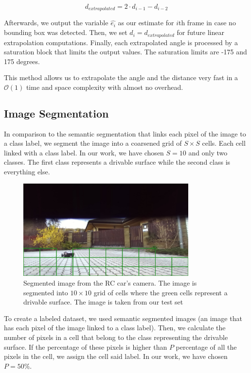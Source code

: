 \begin{equation}
d_{extrapolated} = 2\cdot d_{i-1} - d_{i-2}
\end{equation}

Afterwards, we output the variable $\hat{e_{i}}$ as our estimate for $i$th frame in case no bounding box was detected. Then, we set $d_i = d_{extrapolated}$ for future linear extrapolation computations. Finally, each extrapolated angle is processed by a saturation block that limits the output values. The saturation limits are -175 and 175 degrees. \par


This method allows us to extrapolate the angle and the distance very fast in a $\mathcal{O}(1)$ time and space complexity with almost no overhead.




\subsection{Image Segmentation}
In comparison to the semantic segmentation that links each pixel of the image to a class label, we segment the image into a coarsened grid of $S\times S$ cells. Each cell linked with a class label. In our work, we have chosen $S=10$ and only two classes. The first class represents a drivable surface while the second class is everything else. \par


\begin{figure}[h!]
    \centering
    \includegraphics[width=0.8\textwidth]{images/segmented_image.png}
    
    \caption{Segmented image from the RC car's camera. The image is segmented into $10\times 10$ grid of cells where the green cells represent a drivable surface. The image is taken from our test set}\label{f:segmented_image}
\end{figure}

To create a labeled dataset, we used semantic segmented images (an image that has each pixel of the image linked to a class label). Then, we calculate the number of pixels in a cell that belong to the class representing the drivable surface. If the percentage of these pixels is higher than $P$ percentage of all the pixels in the cell, we assign the cell said label. In our work, we have chosen $P=50\%$.\par


